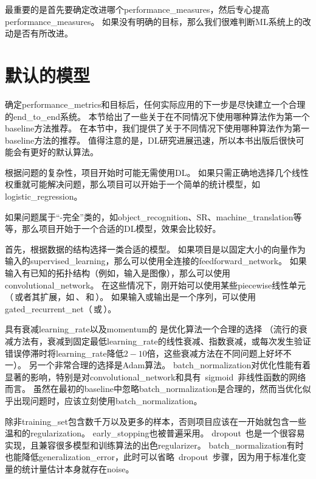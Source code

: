 最重要的是首先要确定改进哪个\gls{performance_measures}，然后专心提高\gls{performance_measures}。
如果没有明确的目标，那么我们很难判断\gls{ML}系统上的改动是否有所改进。


\section{默认的模型}
\label{sec:default_baseline_models}
确定\gls{performance_metrics}和目标后，任何实际应用的下一步是尽快建立一个合理的\gls{end_to_end}系统。
本节给出了一些关于在不同情况下使用哪种算法作为第一个\gls{baseline}方法推荐。
在本节中，我们提供了关于不同情况下使用哪种算法作为第一\gls{baseline}方法的推荐。
值得注意的是，\gls{DL}研究进展迅速，所以本书出版后很快可能会有更好的默认算法。

根据问题的复杂性，项目开始时可能无需使用\gls{DL}。
如果只需正确地选择几个线性权重就可能解决问题，那么项目可以开始于一个简单的统计模型，如\gls{logistic_regression}。


如果问题属于``-完全''类的，如\gls{object_recognition}、\gls{SR}、\gls{machine_translation}等等，那么项目开始于一个合适的\gls{DL}模型，效果会比较好。


首先，根据数据的结构选择一类合适的模型。
如果项目是以固定大小的向量作为输入的\gls{supervised_learning}，那么可以使用全连接的\gls{feedforward_network}。
如果输入有已知的拓扑结构（例如，输入是图像），那么可以使用\gls{convolutional_network}。
在这些情况下，刚开始可以使用某些\gls{piecewise}线性单元（\,或者其扩展，如\,、\,和\,）。
如果输入或输出是一个序列，可以使用\gls{gated_recurrent_net}（\,或\,）。

具有衰减\gls{learning_rate}以及\gls{momentum}的\,\,是优化算法一个合理的选择
（流行的衰减方法有，衰减到固定最低\gls{learning_rate}的线性衰减、指数衰减，或每次发生验证错误停滞时将\gls{learning_rate}降低$2-10$倍，这些衰减方法在不同问题上好坏不一）。
另一个非常合理的选择是Adam算法。
\gls{batch_normalization}对优化性能有着显著的影响，特别是对\gls{convolutional_network}和具有~\gls{sigmoid}~非线性函数的网络而言。
虽然在最初的\gls{baseline}中忽略\gls{batch_normalization}是合理的，然而当优化似乎出现问题时，应该立刻使用\gls{batch_normalization}。


除非\gls{training_set}包含数千万以及更多的样本，否则项目应该在一开始就包含一些温和的\gls{regularization}。 
\gls{early_stopping}也被普遍采用。
\gls{dropout}~也是一个很容易实现，且兼容很多模型和训练算法的出色\gls{regularizer}。
\gls{batch_normalization}有时也能降低\gls{generalization_error}，此时可以省略~\gls{dropout}~步骤，因为用于标准化变量的统计量估计本身就存在\gls{noise}。 %


